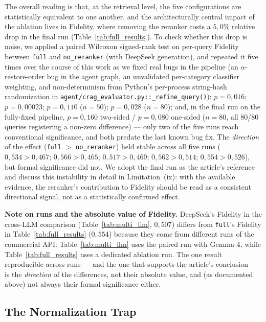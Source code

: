\documentclass[runningheads]{llncs}
\begin{document}
The overall reading is that, at the retrieval level, the five configurations are statistically equivalent to one another, and the architecturally central impact of the ablation lives in Fidelity, where removing the reranker costs a $5{,}0\%$ relative drop in the final run (Table~\ref{tab:full_results}). To check whether this drop is noise, we applied a paired Wilcoxon signed-rank test on per-query Fidelity between \texttt{full} and \texttt{no\_reranker} (with DeepSeek generation), and repeated it five times over the course of this work as we fixed real bugs in the pipeline (an $\alpha$-restore-order bug in the agent graph, an unvalidated per-category classifier weighting, and non-determinism from Python's per-process string-hash randomization in \texttt{agent/crag\_evaluator.py::\_refine\_query()}): $p{=}0{,}016$; $p{=}0{,}00023$; $p{=}0{,}110$ ($n{=}50$); $p{=}0{,}028$ ($n{=}80$); and, in the final run on the fully-fixed pipeline, $p{=}0{,}160$ two-sided / $p{=}0{,}080$ one-sided ($n{=}80$, all 80/80 queries registering a non-zero difference) — only two of the five runs reach conventional significance, and both predate the last known bug fix. The \emph{direction} of the effect (\texttt{full} $>$ \texttt{no\_reranker}) held stable across all five runs ($0{,}534{>}0{,}467$; $0{,}566{>}0{,}465$; $0{,}517{>}0{,}469$; $0{,}562{>}0{,}514$; $0{,}554{>}0{,}526$), but formal significance did not. We adopt the final run as the article's reference and discuss this instability in detail in Limitation~(ix): with the available evidence, the reranker's contribution to Fidelity should be read as a consistent directional signal, not as a statistically confirmed effect.

\textbf{Note on runs and the absolute value of Fidelity.} DeepSeek's Fidelity in the cross-LLM comparison (Table~\ref{tab:multi_llm}, $0{,}507$) differs from \texttt{full}'s Fidelity in Table~\ref{tab:full_results} ($0{,}554$) because they come from different runs of the commercial API: Table~\ref{tab:multi_llm} uses the paired run with Gemma-4, while Table~\ref{tab:full_results} uses a dedicated ablation run. The one result reproducible across runs — and the one that supports the article's conclusion — is the \emph{direction} of the differences, not their absolute value, and (as documented above) not always their formal significance either.

\subsection{The Normalization Trap}
\label{sec:crag_validation}
\end{document}
